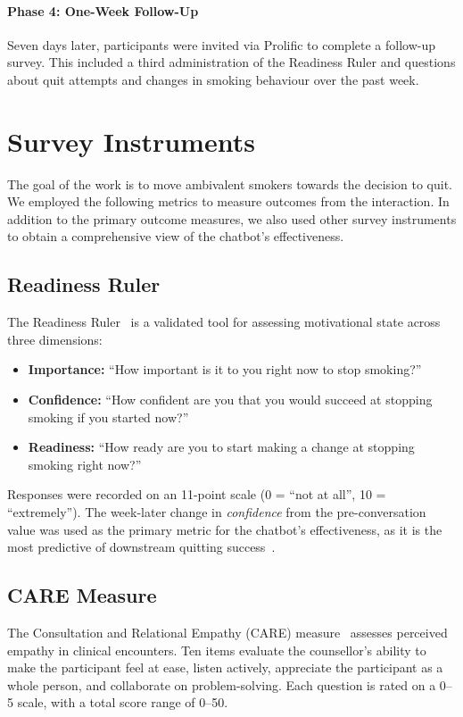 \paragraph{Phase 4: One-Week Follow-Up}
Seven days later, participants were invited via Prolific to complete a follow-up survey. This included a third administration of the Readiness Ruler and questions about quit attempts and changes in smoking behaviour over the past week.

\section{Survey Instruments}
\label{subsec:survey-instruments}

The goal of the work is to move ambivalent smokers towards the decision to quit. We employed the following metrics to measure outcomes from the interaction. In addition to the primary outcome measures, we also used other survey instruments to obtain a comprehensive view of the chatbot's effectiveness.

\subsection{Readiness Ruler}
\label{subsec:readiness-ruler}
The Readiness Ruler~\citep{rollnick1992development} is a validated tool for assessing motivational state across three dimensions:
\begin{itemize}
    \item \textbf{Importance:} ``How important is it to you right now to stop smoking?''
    \item \textbf{Confidence:} ``How confident are you that you would succeed at stopping smoking if you started now?''
    \item \textbf{Readiness:} ``How ready are you to start making a change at stopping smoking right now?''
\end{itemize}
Responses were recorded on an 11-point scale (0 = ``not at all'', 10 = ``extremely''). The week-later change in \emph{confidence} from the pre-conversation value was used as the primary metric for the chatbot's effectiveness, as it is the most predictive of downstream quitting success~\cite{Gwaltney2009-wj,Abar2013}.

\subsection{CARE Measure}
\label{subsec:care}
The Consultation and Relational Empathy (CARE) measure~\citep{10.1093/fampra/cmh621,Bikker2015} assesses perceived empathy in clinical encounters. Ten items evaluate the counsellor's ability to make the participant feel at ease, listen actively, appreciate the participant as a whole person, and collaborate on problem-solving. Each question is rated on a 0--5 scale, with a total score range of 0--50.

